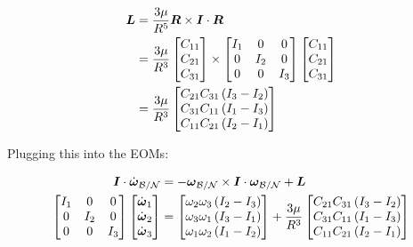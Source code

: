 \begin{align*}
    \boldsymbol{L} &= \frac{3\mu}{R^5} \boldsymbol{R} \times \boldsymbol{I} \cdot \boldsymbol{R} \\
    &= \frac{3\mu}{R^3} \begin{bmatrix} C_{11} \\ C_{21} \\ C_{31} \end{bmatrix} \times \begin{bmatrix} I_1 & 0 & 0 \\ 0 & I_2 & 0 \\ 0 & 0 & I_3 \end{bmatrix} \begin{bmatrix} C_{11} \\ C_{21} \\ C_{31} \end{bmatrix} \\
    &= \frac{3\mu}{R^3} \begin{bmatrix} C_{21} C_{31} \left(I_3 - I_2\right) \\ C_{31} C_{11} \left(I_1 - I_3\right) \\ C_{11} C_{21} \left(I_2 - I_1\right) \end{bmatrix} \\
\end{align*}

Plugging this into the EOMs:

\begin{align*}
    \boldsymbol{I} \cdot \dot{\boldsymbol{\omega}}_\mathcal{B/N} &= -\boldsymbol{\omega}_\mathcal{B/N} \times \boldsymbol{I} \cdot \boldsymbol{\omega}_\mathcal{B/N} + \boldsymbol{L} \\
    \begin{bmatrix} I_1 & 0 & 0 \\ 0 & I_2 & 0 \\ 0 & 0 & I_3 \end{bmatrix} \begin{bmatrix} \dot{\boldsymbol{\omega}}_1 \\ \dot{\boldsymbol{\omega}}_2 \\ \dot{\boldsymbol{\omega}}_3 \end{bmatrix} &= \begin{bmatrix} \omega_2 \omega_3 \left(I_2 - I_3\right) \\ \omega_3 \omega_1 \left(I_3 - I_1\right) \\ \omega_1 \omega_2 \left(I_1 - I_2\right) \end{bmatrix} + \frac{3\mu}{R^3} \begin{bmatrix} C_{21} C_{31} \left(I_3 - I_2\right) \\ C_{31} C_{11} \left(I_1 - I_3\right) \\ C_{11} C_{21} \left(I_2 - I_1\right) \end{bmatrix} \\
\end{align*}

